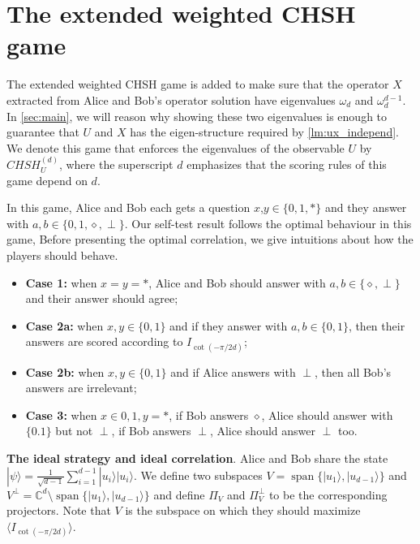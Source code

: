 \documentclass[11pt,letterpaper]{article}
\newcommand{\ket}[1]{|#1\rangle}
\DeclareMathOperator{\spn}{span}
\newcommand{\C}{\mathbb{C}}
\newcommand{\1}{\mathbb{1}}
\newcommand{\CHSH}{CHSH^{(d)}}
\theoremstyle{definition}
\begin{document}
\section{The extended weighted CHSH game}
\label{sec:chsh}
The extended weighted CHSH game is added to make sure that the operator $X$ extracted from 
Alice and Bob's operator solution have eigenvalues $\omega_d$ and $\omega_d^{d-1}$.
In \cref{sec:main}, we will reason why showing these two eigenvalues is enough to guarantee that 
$U$ and $X$ has the eigen-structure required by \cref{lm:ux_independ}.
We denote this game that enforces the eigenvalues of the observable $U$ by
$\CHSH_U$, where the superscript $d$ emphasizes that the scoring rules of this game depend on $d$.


In this game, Alice and Bob each gets a question $x$,$y \in \{ 0, 1, \ast\}$ and 
they answer with $a,b \in \{0,1,\diamond,\perp\}$. 
Our self-test result follows the optimal behaviour in this game,
Before presenting the optimal correlation, we give intuitions about how the players should behave.
\begin{itemize}
	\item \textbf{Case 1:} when $x = y = \ast$, Alice and Bob should answer with $a, b \in \{\diamond, \perp\}$ and 
	their answer should agree;
	\item \textbf{Case 2a:} when $x,y \in \{0,1\}$ and if they answer with $a,b \in \{0,1\}$, then
	their answers are scored according to $I_{\cot(-\pi/2d)}$;
	\item \textbf{Case 2b:} when $x,y \in \{0,1\}$ and if Alice answers with $\perp$, then all Bob's answers are irrelevant;
	\item \textbf{Case 3:} when $x \in {0,1}, y = \ast$, if Bob answers $\diamond$, 
	Alice should answer with $\{0.1\}$ but not $\perp$,
	if Bob answers $\perp$, Alice should answer $\perp$ too.
\end{itemize}
\textbf{The ideal strategy and ideal correlation}. Alice and Bob share the state $\ket{\psi} =\frac{1}{\sqrt{d-1}} \sum_{i=1}^{d-1} \ket{u_i}\ket{u_i}$.
We define two subspaces $V = \spn\{\ket{u_1}, \ket{u_{d-1}}\}$ and $V^\perp = \C^d \setminus\spn\{\ket{u_1}, \ket{u_{d-1}}\}$ and
define $\Pi_V$ and $\Pi_{V}^\perp$ to be the corresponding projectors. Note that $V$ is the subspace on which they should
maximize $\langle I_{\cot(-\pi/2d)} \rangle$.
\end{document}
